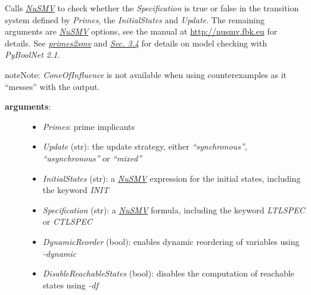 \documentclass[letterpaper,10pt,english]{sphinxmanual}
\begin{document}
\begin{fulllineitems}
\label{ModelChecking:PyBoolNet.ModelChecking.check_primes_with_counterexample}
Calls {\hyperref[Installation:installation-nusmv]{\emph{NuSMV}}} to check whether the \emph{Specification} is true or false in the transition system defined by \emph{Primes},
the \emph{InitialStates} and \emph{Update}.
The remaining arguments are {\hyperref[Installation:installation-nusmv]{\emph{NuSMV}}} options, see the manual at \href{http://nusmv.fbk.eu}{http://nusmv.fbk.eu} for details.
See {\hyperref[ModelChecking:primes2smv]{\emph{primes2smv}}} and {\hyperref[Manual:sec-model-checking]{\emph{Sec. 3.4}}} for details on model checking with \emph{PyBoolNet 2.1}.

\begin{notice}{note}{Note:}
\emph{ConeOfInfluence} is not available when using counterexamples as it ``messes'' with the output.
\end{notice}
\begin{description}
\item[{\textbf{arguments}:}] \leavevmode\begin{itemize}
\item {} 
\emph{Primes}: prime implicants

\item {} 
\emph{Update} (str): the update strategy, either \emph{``synchronous''}, \emph{``asynchronous''} or \emph{``mixed''}

\item {} 
\emph{InitialStates} (str): a {\hyperref[Installation:installation-nusmv]{\emph{NuSMV}}} expression for the initial states, including the keyword \emph{INIT}

\item {} 
\emph{Specification} (str): a {\hyperref[Installation:installation-nusmv]{\emph{NuSMV}}} formula, including the keyword \emph{LTLSPEC} or \emph{CTLSPEC}

\item {} 
\emph{DynamicReorder} (bool): enables dynamic reordering of variables using \emph{-dynamic}

\item {} 
\emph{DisableReachableStates} (bool): disables the computation of reachable states using \emph{-df}

\end{itemize}


\end{description}
\end{fulllineitems}
\end{document}
